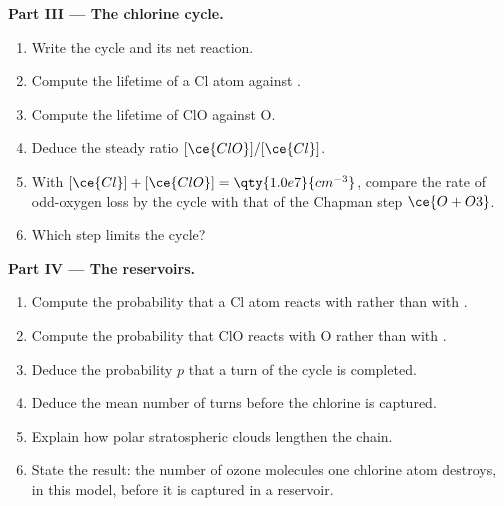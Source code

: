 \begin{problem}
\medskip\noindent\textbf{Part III --- The chlorine cycle.}
\begin{enumerate}[resume]
  \item Write the cycle and its net reaction.
  \item Compute the lifetime of a Cl atom against .
  \item Compute the lifetime of ClO against O.
  \item Deduce the steady ratio $[\ce{ClO}]/[\ce{Cl}]$.
  \item With $[\ce{Cl}] + [\ce{ClO}] = \qty{1.0e7}{cm^{-3}}$, compare the rate of odd-oxygen loss by the
        cycle with that of the Chapman step $\ce{O + O3}$.
  \item Which step limits the cycle?
\end{enumerate}

\medskip\noindent\textbf{Part IV --- The reservoirs.}
\begin{enumerate}[resume]
  \item Compute the probability that a Cl atom reacts with  rather than with
        .
  \item Compute the probability that ClO reacts with O rather than with .
  \item Deduce the probability $p$ that a turn of the cycle is completed.
  \item Deduce the mean number of turns before the chlorine is captured.
  \item Explain how polar stratospheric clouds lengthen the chain.
  \item State the result: the number of ozone molecules one chlorine atom
        destroys, in this model, before it is captured in a reservoir.
\end{enumerate}
\end{problem}
